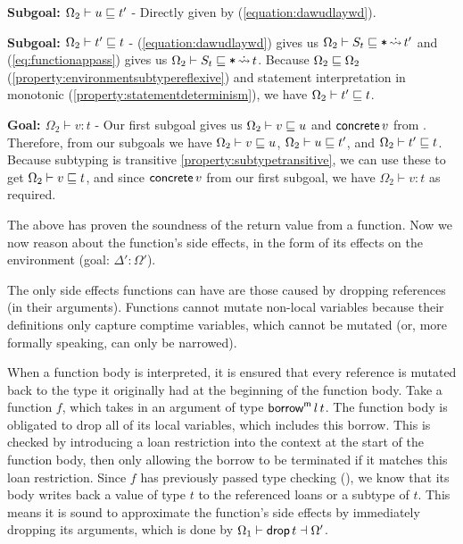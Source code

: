 \documentclass[12pt,twoside]{report}
\begin{document}
\textbf{Subgoal: $\Omega_2 \vdash u \sqsubseteq t'$} - Directly given by (\ref{equation:dawudlaywd}).

\textbf{Subgoal: $\Omega_2 \vdash t' \sqsubseteq t$} - (\ref{equation:dawudlaywd}) gives us $\Omega_2 \vdash S_t \sqsubseteq \text{\texttt{*}} \,\dot{\rightsquigarrow}\, t'$ and (\ref{eq:functionappass}) gives us $\Omega_2 \vdash S_t \sqsubseteq \text{\texttt{*}} \,\dot{\rightsquigarrow}\, t$. Because $\Omega_2 \sqsubseteq \Omega_2$ (\ref{property:environmentsubtypereflexive}) and statement interpretation in monotonic (\ref{property:statementdeterminism}), we have $\Omega_2 \vdash t' \sqsubseteq t$.

\textbf{Goal: $\Omega_2 \vdash v: t$} - Our first subgoal gives us $\Omega_2 \vdash v \sqsubseteq u$ and $ \mathsf{concrete} \, v $ from . Therefore, from our subgoals we have $\Omega_2 \vdash v \sqsubseteq u$, $\Omega_2 \vdash u \sqsubseteq t'$, and $\Omega_2 \vdash t' \sqsubseteq t$. Because subtyping is transitive \ref{property:subtypetransitive}, we can use these to get $\Omega_2 \vdash v \sqsubseteq t$, and since $ \mathsf{concrete} \, v $ from our first subgoal, we have $\Omega_2 \vdash v: t$ as required.

The above has proven the soundness of the return value from a function. Now we now reason about the function's side effects, in the form of its effects on the environment (goal: $\Delta': \Omega'$).

The only side effects functions can have are those caused by dropping references (in their arguments). Functions cannot mutate non-local variables because their definitions only capture comptime variables, which cannot be mutated (or, more formally speaking, can only be narrowed).

When a function body is interpreted, it is ensured that every reference is mutated back to the type it originally had at the beginning of the function body. Take a function $f$, which takes in an argument  of type $\mathsf{borrow}^{\mathsf{m}}\,l\,t$. The function body is obligated to drop all of its local variables, which includes this borrow. This is checked by introducing a loan restriction into the context at the start of the function body, then only allowing the borrow to be terminated if it matches this loan restriction. Since $f$ has previously passed type checking (), we know that its body writes back a value of type $t$ to the referenced loans or a subtype of $t$. This means it is sound to approximate the function's side effects by immediately dropping its arguments, which is done by $\Omega_1 \vdash  \mathsf{drop} \, t  \dashv \Omega'$.
\end{document}

